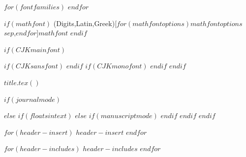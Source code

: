 $for(fontfamilies)$
  \setmonofont[$for(monofontoptions)$$monofontoptions$$sep$,$endfor$$if(monofontfallback)$,RawFeature={fallback=monofontfallback}$endif$]{$monofont$}
$endfor$

$if(mathfont)$
\setmathfont(Digits,Latin,Greek)[$for(mathfontoptions)$$mathfontoptions$$sep$,$endfor$]{$mathfont$}
$endif$

$if(CJKmainfont)$
    \usepackage{xeCJK}
    $if(CJKsansfont)$
    $endif$
    $if(CJKmonofont)$
    $endif$
$endif$

$title.tex()$

$if(journalmode)$
\usepackage{pbalance}
\makeatletter
\let\oldtpt\ThreePartTable
\let\endoldtpt\endThreePartTable
\def\ThreePartTable{\@ifnextchar[\ThreePartTable@i \ThreePartTable@ii}
\def\ThreePartTable@i[#1]{\begin{figure}[!htbp]
\onecolumn
\begin{minipage}{0.485\textwidth}
\oldtpt[#1]
}
\def\ThreePartTable@ii{\begin{figure}[!htbp]
\onecolumn
\begin{minipage}{0.48\textwidth}
\oldtpt
}
\def\endThreePartTable{
\endoldtpt
\end{minipage}
\twocolumn
\end{figure}}
\makeatother


\makeatletter
\let\endoldlt\endlongtable		
\def\endlongtable{
\hline
\endoldlt}
\makeatother

\newenvironment{twocolumntable}%
{%
\begin{table}[!htbp]%
\onecolumn%
}%
{%
\twocolumn%
\end{table}%
}%
$else$
\makeatletter
\let\endoldlt\endlongtable
\def\endlongtable{
\hline
\endoldlt
}
\makeatother
$if(floatsintext)$
$else$
$if(manuscriptmode)$
\RequirePackage{longtable}
$endif$
$endif$
$endif$



$for(header-insert)$
$header-insert$
$endfor$

$for(header-includes)$
$header-includes$
$endfor$

\makeatletter
\xpatchcmd{\appendix}
  {\par}
  {\par}
  {}{}
\makeatother

